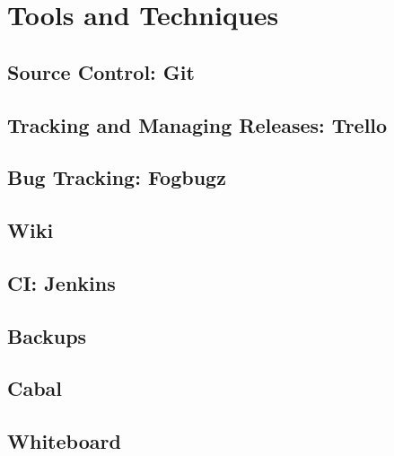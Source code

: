 \section{Tools and Techniques}

\subsection{Source Control: Git}

\subsection{Tracking and Managing Releases: Trello}

\subsection{Bug Tracking: Fogbugz}

\subsection{Wiki}

\subsection{CI: Jenkins}

\subsection{Backups}

\subsection{Cabal}

\subsection{Whiteboard}